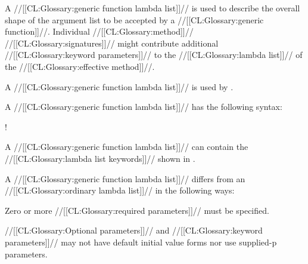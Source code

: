 \endsubsubsection%

\endsubSection%


A //[[CL:Glossary:generic function lambda list]]// is used to describe the overall shape of
the argument list to be accepted by a //[[CL:Glossary:generic function]]//.
Individual //[[CL:Glossary:method]]// //[[CL:Glossary:signatures]]// might contribute additional 
//[[CL:Glossary:keyword parameters]]// to the //[[CL:Glossary:lambda list]]// of the //[[CL:Glossary:effective method]]//.


A //[[CL:Glossary:generic function lambda list]]// is used by .











A //[[CL:Glossary:generic function lambda list]]// has the following syntax:

\Vskip 1pc!

A //[[CL:Glossary:generic function lambda list]]// can contain the //[[CL:Glossary:lambda list keywords]]// shown
in \thenextfigure.


A //[[CL:Glossary:generic function lambda list]]// differs from an //[[CL:Glossary:ordinary lambda list]]// 
in the following ways:
 
\beginlist
{}




Zero or more //[[CL:Glossary:required parameters]]// must be specified.

 
//[[CL:Glossary:Optional parameters]]// and //[[CL:Glossary:keyword parameters]]// may not have 
default initial value forms nor use supplied-p parameters.


